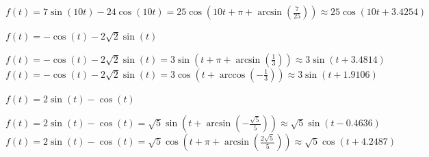 \documentclass{ximera}
\begin{document}
\begin{question}
\begin{problem}
\begin{solution}
$f(t) = 7\sin(10t) - 24\cos(10t) = 25\cos\left( 10t + \pi + \arcsin\left(\frac{7}{25}\right)\right) \approx 25 \cos(10t+3.4254)$
\end{solution}
\end{problem}

\begin{problem}
$f(t) = -\cos(t) - 2\sqrt{2} \sin(t)$

\begin{solution}
$f(t) = -\cos(t) - 2\sqrt{2} \sin(t) = 3\sin\left(t+\pi + \arcsin\left(\frac{1}{3}\right)\right) \approx 3\sin(t+3.4814)$ \\


$f(t) = -\cos(t) - 2\sqrt{2} \sin(t) = 3\cos\left(t+ \arccos\left(-\frac{1}{3}\right)\right) \approx 3\sin(t+1.9106)$
\end{solution}
\end{problem}

\begin{problem} \label{rewritesinusoidlast}
$f(t) = 2\sin(t) - \cos(t)$

\begin{solution}
$f(t) = 2\sin(t) - \cos(t) = \sqrt{5}\sin\left(t  + \arcsin\left(-\frac{\sqrt{5}}{5}\right)\right) \approx \sqrt{5}\sin(t -0.4636)$ \\

$f(t) = 2\sin(t) - \cos(t) = \sqrt{5}\cos\left(t  + \pi + \arcsin\left(\frac{2\sqrt{5}}{5}\right)\right) \approx \sqrt{5}\cos(t + 4.2487)$
\end{solution}
\end{problem}

\end{question}
\end{document}
